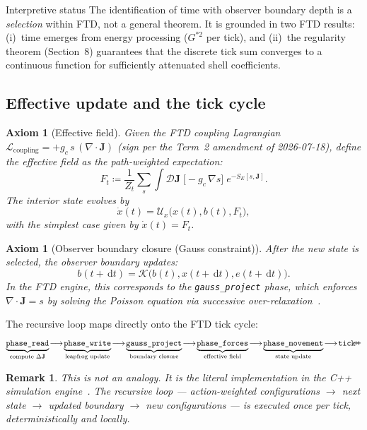 \documentclass[11pt]{article}
\theoremstyle{tight}
\theoremstyle{plainroman}
\newtheorem{axiom}[theorem]{Axiom}
\newtheorem{remark}[theorem]{Remark}
\newcommand{\dd}{\,\mathrm{d}}
\begin{document}
\begin{cautionbox}{Interpretive status}
The identification of time with observer boundary depth is a \emph{selection} within FTD, not a general theorem.
It is grounded in two FTD results: (i)~time emerges from energy processing ($G^{*2}$ per tick), and (ii)~the regularity theorem (Section~8) guarantees that the discrete tick sum converges to a continuous function for sufficiently attenuated shell coefficients.
\end{cautionbox}

\subsection{Effective update and the tick cycle}

\begin{axiom}[Effective field]
Given the FTD coupling Lagrangian $\mathcal L_{\text{coupling}}=+g_c\,s\,(\nabla\!\cdot\!\mathbf J)$ (sign per the Term~2 amendment of 2026-07-18), define the effective field as the path-weighted expectation:
\[
F_t \coloneqq \frac{1}{Z_t}\sum_s\int\mathcal D\mathbf J\;\bigl[-g_c\,\nabla s\bigr]\;e^{-S_E[s,\mathbf J]}.
\]
The interior state evolves by
\[
\dot x(t)=\mathcal U_x\bigl(x(t),b(t),F_t\bigr),
\]
with the simplest case given by $\dot x(t)=F_t$.
\end{axiom}

\begin{axiom}[Observer boundary closure (Gauss constraint)]
After the new state is selected, the observer boundary updates:
\[
b(t+\dd t)=\mathcal K\bigl(b(t),x(t+\dd t),e(t+\dd t)\bigr).
\]
In the FTD engine, this corresponds to the \texttt{gauss\_project} phase, which enforces $\nabla\!\cdot\!\mathbf J=s$ by solving the Poisson equation via successive over-relaxation~\cite{ftdengine}.
\end{axiom}

The recursive loop maps directly onto the FTD tick cycle:
\[
\underbrace{\texttt{phase\_read}}_{\text{compute }\Delta\mathbf J}
\!\longrightarrow\!
\underbrace{\texttt{phase\_write}}_{\text{leapfrog update}}
\!\longrightarrow\!
\underbrace{\texttt{gauss\_project}}_{\text{boundary closure}}
\!\longrightarrow\!
\underbrace{\texttt{phase\_forces}}_{\text{effective field}}
\!\longrightarrow\!
\underbrace{\texttt{phase\_movement}}_{\text{state update}}
\!\longrightarrow\!
\texttt{tick\!+\!+}
\]

\begin{remark}
This is not an analogy. It is the literal implementation in the C++ simulation engine~\cite{ftdengine}.
The recursive loop --- action-weighted configurations $\to$ next state $\to$ updated boundary $\to$ new configurations --- is executed once per tick, deterministically and locally.
\end{remark}
\end{document}
